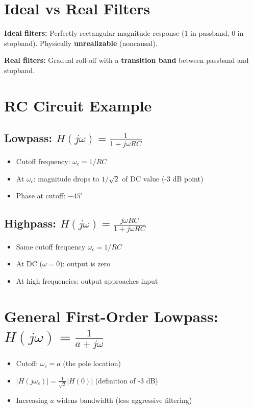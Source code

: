 \documentclass[11pt]{article}
\begin{document}
\section*{Ideal vs Real Filters}

\textbf{Ideal filters:} Perfectly rectangular magnitude response (1 in passband, 0 in stopband). Physically \textbf{unrealizable} (noncausal).

\textbf{Real filters:} Gradual roll-off with a \textbf{transition band} between passband and stopband.

\section*{RC Circuit Example}

\subsection*{Lowpass: $H(j\omega) = \frac{1}{1 + j\omega RC}$}

\begin{itemize}
  \item Cutoff frequency: $\omega_c = 1/RC$
  \item At $\omega_c$: magnitude drops to $1/\sqrt{2}$ of DC value (-3 dB point)
  \item Phase at cutoff: $-45^\circ$
\end{itemize}

\subsection*{Highpass: $H(j\omega) = \frac{j\omega RC}{1 + j\omega RC}$}

\begin{itemize}
  \item Same cutoff frequency $\omega_c = 1/RC$
  \item At DC ($\omega = 0$): output is zero
  \item At high frequencies: output approaches input
\end{itemize}

\section*{General First-Order Lowpass: $H(j\omega) = \frac{1}{a + j\omega}$}

\begin{itemize}
  \item Cutoff: $\omega_c = a$ (the pole location)
  \item $|H(j\omega_c)| = \frac{1}{\sqrt{2}} |H(0)|$ (definition of -3 dB)
  \item Increasing $a$ widens bandwidth (less aggressive filtering)
\end{itemize}
\end{document}
